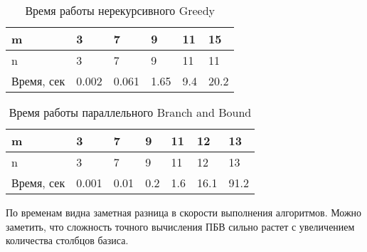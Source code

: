 \begin{table}[H]
  \caption{Время работы нерекурсивного Greedy}
  \centering
  \begin{tabular}{ | l | l | l | l | l | l | }
  \hline
  m & 3 & 7 & 9 & 11 & 15 \\ \hline
  n & 3 & 7 & 9 & 11 & 11 \\ \hline
  Время, сек & 0.002 & 0.061 & 1.65 & 9.4 & 20.2 \\ \hline
  \end{tabular}
  \label{table:BB}
\end{table}

\begin{table}[H]
  \caption{Время работы параллельного Branch and Bound}
  \centering
  \begin{tabular}{ | l | l | l | l | l | l | l | }
  \hline
  m & 3 & 7 & 9 & 11 & 12 & 13 \\ \hline
  n & 3 & 7 & 9 & 11 & 12 & 13 \\ \hline
  Время, сек & 0.001 & 0.01 & 0.2 & 1.6 & 16.1 & 91.2 \\ \hline
  \end{tabular}
  \label{table:BB_parallel}
\end{table}

По временам видна заметная разница в скорости выполнения алгоритмов. Можно заметить, что сложность точного вычисления ПБВ сильно растет с увеличением количества столбцов базиса.

\clearpage